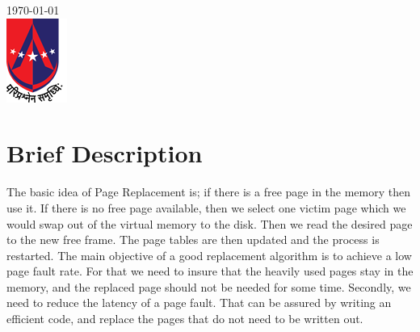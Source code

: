 \documentclass[12pt]{article}
\begin{document}
\begin{titlepage}
		
		
		{\large \today}\\[2cm] %
		
		
		\includegraphics{AU.png}\\[0.5cm] %
		
		
		\vfill %
		
	\end{titlepage}
	
	
	
	\section{Brief Description}
	The basic idea of Page Replacement is; if there is a free page in the memory then use it. If there is no free page available, then we select one victim page which we would swap out of the virtual memory to the disk. Then we read the desired page to the new free frame. The page tables are then updated and the process is restarted.
	The main objective of a good replacement algorithm is to achieve a low page fault rate. For that we need to insure that the heavily used pages stay in the memory, and the replaced page should not be needed for some time.
	Secondly, we need to reduce the latency of a page fault. That can be assured by writing an efficient code, and replace the pages that do not need to be written out.	
\end{document}
